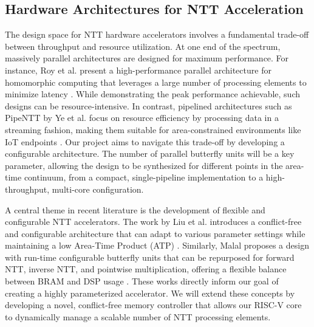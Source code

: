\documentclass[a4paper, 12pt, titlepage]{article}
\begin{document}
\subsection{Hardware Architectures for NTT Acceleration}
The design space for NTT hardware accelerators involves a fundamental trade-off between throughput and resource utilization. At one end of the spectrum, massively parallel architectures are designed for maximum performance. For instance, Roy et al. present a high-performance parallel architecture for homomorphic computing that leverages a large number of processing elements to minimize latency \cite{Roy2019FPGA}. While demonstrating the peak performance achievable, such designs can be resource-intensive. In contrast, pipelined architectures such as PipeNTT by Ye et al. focus on resource efficiency by processing data in a streaming fashion, making them suitable for area-constrained environments like IoT endpoints \cite{Ye2022PipeNTT}. Our project aims to navigate this trade-off by developing a configurable architecture. The number of parallel butterfly units will be a key parameter, allowing the design to be synthesized for different points in the area-time continuum, from a compact, single-pipeline implementation to a high-throughput, multi-core configuration.

A central theme in recent literature is the development of flexible and configurable NTT accelerators. The work by Liu et al. introduces a conflict-free and configurable architecture that can adapt to various parameter settings while maintaining a low Area-Time Product (ATP) \cite{Liu2024Area}. Similarly, Malal proposes a design with run-time configurable butterfly units that can be repurposed for forward NTT, inverse NTT, and pointwise multiplication, offering a flexible balance between BRAM and DSP usage \cite{Malal2023Designing}. These works directly inform our goal of creating a highly parameterized accelerator. We will extend these concepts by developing a novel, conflict-free memory controller that allows our RISC-V core to dynamically manage a scalable number of NTT processing elements.
\end{document}
